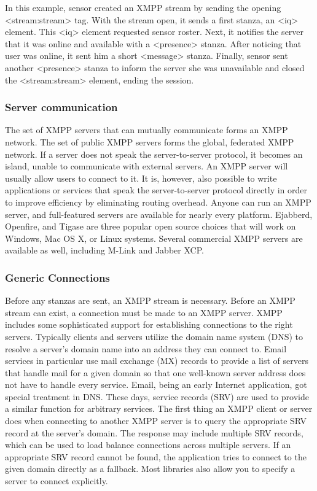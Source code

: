 	In this example, sensor created an XMPP stream by sending the opening <stream:stream> tag. With the stream open, it sends a first stanza, an <iq> element. This <iq> element requested sensor roster. Next, it notifies the server that it was online and available with a <presence> stanza. After noticing that user was online, it sent him a short <message> stanza. Finally, sensor sent another <presence> stanza to inform the server she was unavailable and closed the <stream:stream> element, ending the session.
    
    \subsubsection{Server communication}
	The set of XMPP servers that can mutually communicate forms an XMPP network. The set of public XMPP servers forms the global, federated XMPP network. If a server does not speak the server-to-server protocol, it becomes an island, unable to communicate with external servers. An XMPP server will usually allow users to connect to it. It is, however, also possible to write applications or services that speak the server-to-server protocol directly in order to improve efficiency by eliminating routing overhead. Anyone can run an XMPP server, and full-featured servers are available for nearly every platform. Ejabberd, Openfire, and Tigase are three popular open source choices that will work on Windows, Mac OS X, or Linux systems. Several commercial XMPP servers are available as well, including M-Link and Jabber XCP.
	
	\subsubsection{Generic Connections}
	Before any stanzas are sent, an XMPP stream is necessary. Before an XMPP stream can exist, a connection must be made to an XMPP server. XMPP includes some sophisticated support for establishing connections to the right servers. Typically clients and servers utilize the domain name system (DNS) to resolve a server's domain name into an address they can connect to. Email services in particular use mail exchange (MX) records to provide a list of servers that handle mail for a given domain so that one well-known server address does not have to handle every service. Email, being an early Internet application, got special treatment in DNS. These days, service records (SRV) are used to provide a similar function for arbitrary services. The first thing an XMPP client or server does when connecting to another XMPP server is to query the appropriate SRV record at the server’s domain. The response may include multiple SRV records, which can be used to load balance connections across multiple servers. If an appropriate SRV record cannot be found, the application tries to connect to the given domain directly as a fallback. Most libraries also allow you to specify a server to connect explicitly.

